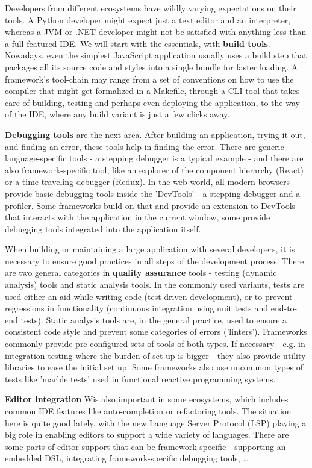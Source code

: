 \documentclass[english,odsaz]{fitthesis}
\begin{document}
Developers from different ecosystems have wildly varying expectations on their
tools. A Python developer might expect just a text editor and an interpreter,
whereas a JVM or .NET developer might not be satisfied with anything less than a
full-featured IDE. We will start with the essentials, with \textbf{build
tools}. Nowadays, even the simplest JavaScript application usually uses a build
step that packages all its source code and styles into a single bundle for
faster loading. A framework's tool-chain may range from a set of conventions on
how to use the compiler that might get formalized in a Makefile, through a CLI
tool that takes care of building, testing and perhaps even deploying the
application, to the way of the IDE, where any build variant is just a few clicks
away.

\textbf{Debugging tools} are the next area. After building an application, trying it out,
and finding an error, these tools help in finding the error. There are generic
language-specific tools - a stepping debugger is a typical example - and there
are also framework-specific tool, like an explorer of the component hierarchy
(React) or a time-traveling debugger (Redux). In the web world, all modern
browsers provide basic debugging tools inside the 'DevTools' - a stepping
debugger and a profiler. Some frameworks build on that and provide an extension
to DevTools that interacts with the application in the current window, some
provide debugging tools integrated into the application itself.

When building or maintaining a large application with several developers, it is
necessary to ensure good practices in all steps of the development
process. There are two general categories in \textbf{quality assurance} tools - testing
(dynamic analysis) tools and static analysis tools. In the commonly used
variants, tests are used either an aid while writing code (test-driven
development), or to prevent regressions in functionality (continuous integration
using unit tests and end-to-end tests). Static analysis tools are, in the
general practice, used to ensure a consistent code style and prevent some
categories of errors ('linters'). Frameworks commonly provide pre-configured
sets of tools of both types. If necessary - e.g. in integration testing where
the burden of set up is bigger - they also provide utility libraries to ease the
initial set up. Some frameworks also use uncommon types of tests like 'marble
tests' used in functional reactive programming systems.

\textbf{Editor integration} Wis also important in some ecosystems, which includes common
IDE features like auto-completion or refactoring tools. The situation here is
quite good lately, with the new Language Server Protocol (LSP) playing a big
role in enabling editors to support a wide variety of languages. There are some
parts of editor support that can be framework-specific - supporting an embedded
DSL, integrating framework-specific debugging tools, \ldots{}
\end{document}
